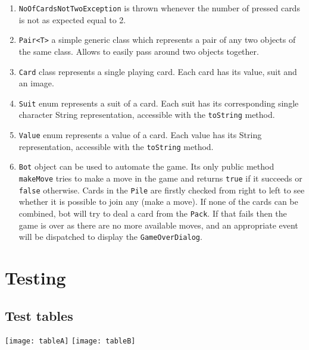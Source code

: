 \documentclass[a4paper, 12pt, titlepage]{article}
\begin{document}
\begin{enumerate}
	\item \texttt{NoOfCardsNotTwoException} is thrown whenever the number of pressed 
		cards is not as expected equal to 2. 
	
	\item \texttt{Pair<T>} a simple generic class which represents a pair of any two 
		objects of the same class. Allows to easily pass around two objects together.

	\item \texttt{Card} class represents a single playing card. Each card has its value, 
		suit and an image.
	
	\item \texttt{Suit} enum represents a suit of a card. Each suit has its corresponding
		single character String representation, accessible with the \texttt{toString} 
		method.
	
	\item \texttt{Value} enum represents a value of a card. Each value has its String 
		representation, accessible with the \texttt{toString} method.

	\item \texttt{Bot} object can be used to automate the game. Its only public method
		\texttt{makeMove} tries to make a move in the game and returns \texttt{true} if
		it succeeds or \texttt{false} otherwise. Cards in the \texttt{Pile} are firstly 
		checked from right to left to see whether it is possible to join any (make a 
		move). If none of the cards can be combined, bot will try to deal a card from 
		the \texttt{Pack}. If that fails then the game is over as there are no more
		available moves, and an appropriate event will be dispatched to display the
		\texttt{GameOverDialog}.
	
\end{enumerate}

\section{Testing}
\subsection{Test tables}
\texttt{[image: tableA]}
\texttt{[image: tableB]}
\newpage
\end{document}
